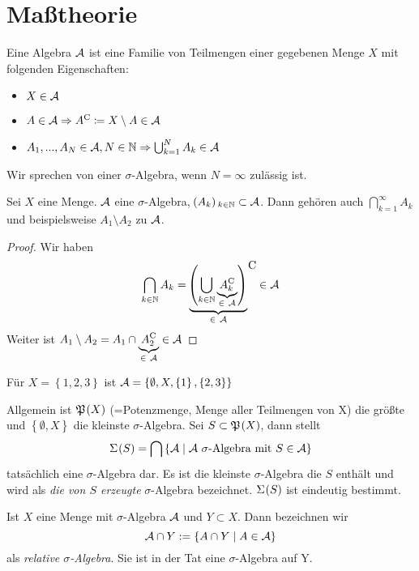 \documentclass[skript.tex]{subfiles}
\begin{document}
	\chapter{Maßtheorie}
	
	\begin{defin}[Algebra]
		Eine Algebra $\mathcal{A}$ ist eine Familie von Teilmengen einer gegebenen Menge $X$ mit folgenden Eigenschaften:
		\begin{itemize}
			\item $X \in \mathcal{A}$
			\item $A \in \mathcal{A} \Rightarrow A^\mathrm{C}\coloneqq X\setminus A \in \mathcal{A}$
			\item $A_1,...,A_N \in \mathcal{A}, N \in \mathbb{N} \Rightarrow \bigcup_{k=1}^N A_k \in \mathcal{A}$
		\end{itemize}
	Wir sprechen von einer $\sigma$-Algebra, wenn $N=\infty$ zulässig ist.
	\end{defin}

	\begin{lem}
		Sei $X$ eine Menge. $\mathcal{A}$ eine $\sigma$-Algebra, $\pr{A_k}_{k\in\mathbb{N}} \subset \mc{A}$. Dann gehören auch $\bigcap_{k=1}^\infty A_k$ und beispielsweise $A_1 \setminus A_2$ zu $\mathcal{A}$. 
	\end{lem}
	\begin{proof}
		Wir haben
			\begin{equation*}
				\bigcap_{k\in\mathbb{N}} A_k = \underbrace{\pr{\bigcup_{k\in\mathbb{N}} \underbrace{\cp{A_k}}_{\in\ \mc{A} } }}_{\in\ \mc{A}}  \raisebox{1.7em}{\kern -0.1em C}  \in \mc{A}
			\end{equation*}
		Weiter ist $A_1\setminus A_2 = A_1 \cap \underbrace{A_2^\mathrm{C}}_{\in\ \mathcal{A}} \in \mathcal{A}$
	\end{proof}
	
	\begin{bsp*}
		Für $X=\left\{ 1,2,3\right\}$ ist $\mathcal{A}=\left\{\emptyset, X, \left\{1\right\}, \left\{ 2,3\right\} \right\}$
	\end{bsp*}
	
	\begin{defin}
		Allgemein ist $\mf{P}\pr{X}$ (=Potenzmenge, Menge aller Teilmengen von X) die größte und $\left\{\emptyset, X \right\}$ die kleinste $\sigma$-Algebra. Sei $S \subset \mf{P}\pr{X}$, dann stellt
		\begin{equation*}
			\Sigma\pr{S} = \bigcap\left\{ \mc{A} \mid \mc{A}\ \sigma\text{-Algebra mit } S \in \mc{A}\right\}
		\end{equation*}
		tatsächlich eine $\sigma$-Algebra dar. Es ist die kleinste $\sigma$-Algebra die $S$ enthält und wird als \textit{die von $S$ erzeugte} $\sigma$-Algebra bezeichnet. $\Sigma\pr{S}$ ist eindeutig bestimmt.
		
		Ist $X$ eine Menge mit $\sigma$-Algebra $\mathcal{A}$ und $Y \subset X$. Dann bezeichnen wir
		\begin{equation*}
			\mathcal{A}\cap Y := \left\{A\cap Y \mid A \in \mathcal{A} \right\}
		\end{equation*}
		als \textit{relative $\sigma$-Algebra}. Sie ist in der Tat eine $\sigma$-Algebra auf Y.
	\end{defin}
\end{document}
